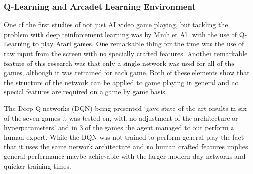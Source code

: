 \documentclass[a4paper]{article}
\begin{document}
\subsubsection{Q-Learning and Arcadet Learning Environment}
One of the first studies of not just AI video game playing, but tackling the problem with deep reinforcement learning was by Mnih et Al.\ with the use of Q-Learning to play Atari games.
One remarkable thing for the time was the use of raw input from the screen with no specially crafted features.
Another remarkable feature of this research was that only a single network was used for all of the games, although it was retrained for each game.
Both of these elements show that the structure of the network can be applied to game playing in general and no special features are required on a game by game basis.
\par
The Deep Q-networks (DQN) being presented `gave state-of-the-art results in six of the seven games it was tested on, with no adjustment of the
architecture or hyperparameters'\cite{ALE} and in 3 of the games the agent managed to out perform a human expert.
While the DQN was not trained to perform general play the fact that it uses the same network architecture and no human crafted features implies general performance maybe achievable with the larger modern day networks and quicker training times.
\end{document}
